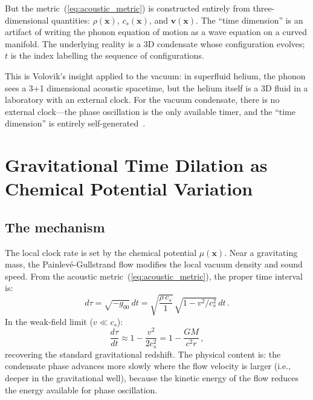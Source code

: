\documentclass[12pt, a4paper]{article}
\begin{document}
But the metric~(\ref{eq:acoustic_metric}) is
constructed entirely from three-dimensional
quantities: $\rho(\mathbf{x})$, $c_s(\mathbf{x})$,
and $\mathbf{v}(\mathbf{x})$. The ``time
dimension'' is an artifact of writing the phonon
equation of motion as a wave equation on a curved
manifold. The underlying reality is a 3D condensate
whose configuration evolves; $t$ is the index
labelling the sequence of configurations.

This is Volovik's insight applied to the vacuum:
in superfluid helium, the phonon sees a 3+1
dimensional acoustic spacetime, but the helium
itself is a 3D fluid in a laboratory with an
external clock. For the vacuum condensate, there is
no external clock---the phase oscillation is the
only available timer, and the ``time dimension''
is entirely self-generated~\cite{volovik_2003}.


\section{Gravitational Time Dilation as Chemical
Potential Variation}
\label{sec:dilation}

\subsection{The mechanism}

The local clock rate is set by the chemical
potential $\mu(\mathbf{x})$. Near a gravitating
mass, the Painlev\'{e}-Gullstrand flow modifies
the local vacuum density and sound speed. From the
acoustic metric~(\ref{eq:acoustic_metric}), the
proper time interval is:
\begin{equation}
    d\tau = \sqrt{-g_{00}}\,dt
    = \sqrt{\frac{\rho\,c_s}{1}}\,
    \sqrt{1 - v^2/c_s^2}\,dt\,.
\label{eq:proper_time}
\end{equation}
In the weak-field limit ($v \ll c_s$):
\begin{equation}
    \frac{d\tau}{dt} \approx 1 - \frac{v^2}{2c_s^2}
    = 1 - \frac{GM}{c^2 r}\,,
\label{eq:redshift}
\end{equation}
recovering the standard gravitational redshift.
The physical content is: the condensate phase
advances more slowly where the flow velocity is
larger (i.e., deeper in the gravitational well),
because the kinetic energy of the flow reduces the
energy available for phase oscillation.
\end{document}
